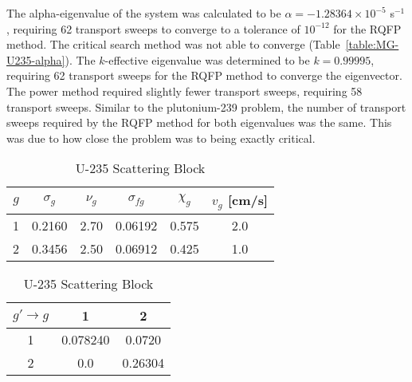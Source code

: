 The alpha-eigenvalue of the system was calculated to be $\alpha = -1.28364 \times 10^{-5}$ s$^{-1}$, requiring 62 transport sweeps to converge to a tolerance of $10^{-12}$ for the RQFP method. The critical search method was not able to converge (Table~\ref{table:MG-U235-alpha}). The $k$-effective eigenvalue was determined to be $k=0.99995$, requiring 62 transport sweeps for the RQFP method to converge the eigenvector. The power method required slightly fewer transport sweeps, requiring 58 transport sweeps. Similar to the plutonium-239 problem, the number of transport sweeps required by the RQFP method for both eigenvalues was the same. This was due to how close the problem was to being exactly critical.

\begin{table}[!htbp]
	\caption{Sood Criticality Benchmark Problem 48 Cross Sections (cm$^{-1}$)}
	\label{table:U235-TwoGroup}
	\begin{subtable}[!htbp]{1.0\textwidth}
		\centering{}
		\begin{tabular}{@{}cccccc@{}}\toprule
			$g$ & $\sigma_{g} $ & $\nu_{g}$ & $\sigma_{fg}$ & $\chi_{g}$ & $v_{g}$ [cm/s] \\ 
        			\midrule
			1 & 0.2160 & 2.70 & 0.06192 & 0.575 & 2.0 \\
			2 & 0.3456 & 2.50 & 0.06912  & 0.425 & 1.0 \\
			\bottomrule
		\end{tabular}
	\caption{U-235 Cross Sections}
	\label{table:TwoGroupU235}
	\end{subtable}%
	\vspace{0.25cm}
	\begin{subtable}[!htbp]{1.0\textwidth}
	\centering{}
	\begin{tabular}{@{}ccc@{}}\toprule
	$g' \rightarrow g$ & 1 & 2 \\ 
        \midrule
	1 & 0.078240 & 0.0720  \\
	2 & 0.0 & 0.26304 \\
	\bottomrule
	\end{tabular}
	\caption{U-235 Scattering Block}
	\label{table:TwoGroupU235_ScatterXS}
	\end{subtable}
\end{table}

\clearpage

